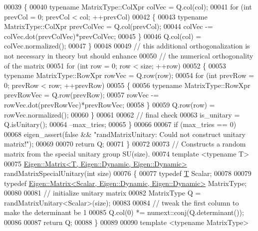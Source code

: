 \begin{DoxyCode}
00039     \{
00040       \textcolor{keyword}{typename} MatrixType::ColXpr colVec = Q.col(col);
00041       \textcolor{keywordflow}{for} (\textcolor{keywordtype}{int} prevCol = 0; prevCol < col; ++prevCol)
00042       \{
00043         \textcolor{keyword}{typename} MatrixType::ColXpr prevColVec = Q.col(prevCol);
00044         colVec -= colVec.dot(prevColVec)*prevColVec;
00045       \}
00046       Q.col(col) = colVec.normalized();
00047     \}
00048 
00049     \textcolor{comment}{// this additional orthogonalization is not necessary in theory but should enhance}
00050     \textcolor{comment}{// the numerical orthogonality of the matrix}
00051     \textcolor{keywordflow}{for} (\textcolor{keywordtype}{int} row = 0; row < size; ++row)
00052     \{
00053       \textcolor{keyword}{typename} MatrixType::RowXpr rowVec = Q.row(row);
00054       \textcolor{keywordflow}{for} (\textcolor{keywordtype}{int} prevRow = 0; prevRow < row; ++prevRow)
00055       \{
00056         \textcolor{keyword}{typename} MatrixType::RowXpr prevRowVec = Q.row(prevRow);
00057         rowVec -= rowVec.dot(prevRowVec)*prevRowVec;
00058       \}
00059       Q.row(row) = rowVec.normalized();
00060     \}
00061 
00062     \textcolor{comment}{// final check}
00063     is\_unitary = Q.isUnitary();
00064     --max\_tries;
00065   \}
00066 
00067   \textcolor{keywordflow}{if} (max\_tries == 0)
00068     eigen\_assert(\textcolor{keyword}{false} && \textcolor{stringliteral}{"randMatrixUnitary: Could not construct unitary matrix!"});
00069 
00070   \textcolor{keywordflow}{return} Q;
00071 \}
00072 
00073 \textcolor{comment}{//  Constructs a random matrix from the special unitary group SU(size).}
00074 \textcolor{keyword}{template} <\textcolor{keyword}{typename} T>
00075 \hyperlink{group___core___module_class_eigen_1_1_matrix}{Eigen::Matrix<T, Eigen::Dynamic, Eigen::Dynamic>} 
      randMatrixSpecialUnitary(\textcolor{keywordtype}{int} size)
00076 \{
00077   \textcolor{keyword}{typedef} \hyperlink{group___sparse_core___module}{T} Scalar;
00078 
00079   \textcolor{keyword}{typedef} \hyperlink{group___core___module_class_eigen_1_1_matrix}{Eigen::Matrix<Scalar, Eigen::Dynamic, Eigen::Dynamic>}
       MatrixType;
00080 
00081   \textcolor{comment}{// initialize unitary matrix}
00082   MatrixType Q = randMatrixUnitary<Scalar>(size);
00083 
00084   \textcolor{comment}{// tweak the first column to make the determinant be 1}
00085   Q.col(0) *= numext::conj(Q.determinant());
00086 
00087   \textcolor{keywordflow}{return} Q;
00088 \}
00089 
00090 \textcolor{keyword}{template} <\textcolor{keyword}{typename} MatrixType>

\end{DoxyCode}
